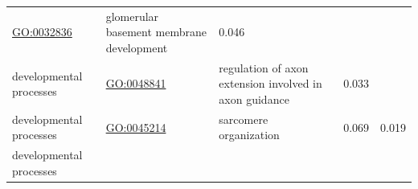\documentclass[
]{article}
\begin{document}
\begin{longtable}[]{@{}lllll@{}}
\begin{minipage}[t]{0.17\columnwidth}
\url{GO:0032836}\strut
\end{minipage} & \begin{minipage}[t]{0.17\columnwidth}\raggedright
glomerular basement membrane development\strut
\end{minipage} & \begin{minipage}[t]{0.17\columnwidth}\raggedright
0.046\strut
\end{minipage} & \begin{minipage}[t]{0.17\columnwidth}\raggedright
\strut
\end{minipage}\tabularnewline
\begin{minipage}[t]{0.17\columnwidth}\raggedright
developmental processes\strut
\end{minipage} & \begin{minipage}[t]{0.17\columnwidth}\raggedright
\url{GO:0048841}\strut
\end{minipage} & \begin{minipage}[t]{0.17\columnwidth}\raggedright
regulation of axon extension involved in axon guidance\strut
\end{minipage} & \begin{minipage}[t]{0.17\columnwidth}\raggedright
0.033\strut
\end{minipage} & \begin{minipage}[t]{0.17\columnwidth}\raggedright
\strut
\end{minipage}\tabularnewline
\begin{minipage}[t]{0.17\columnwidth}\raggedright
developmental processes\strut
\end{minipage} & \begin{minipage}[t]{0.17\columnwidth}\raggedright
\url{GO:0045214}\strut
\end{minipage} & \begin{minipage}[t]{0.17\columnwidth}\raggedright
sarcomere organization\strut
\end{minipage} & \begin{minipage}[t]{0.17\columnwidth}\raggedright
0.069\strut
\end{minipage} & \begin{minipage}[t]{0.17\columnwidth}\raggedright
0.019\strut
\end{minipage}\tabularnewline
\begin{minipage}[t]{0.17\columnwidth}\raggedright
developmental processes\strut
\end{minipage} & \begin{minipage}[t]{0.17\columnwidth}\raggedright

\end{minipage}
\end{longtable}
\end{document}
